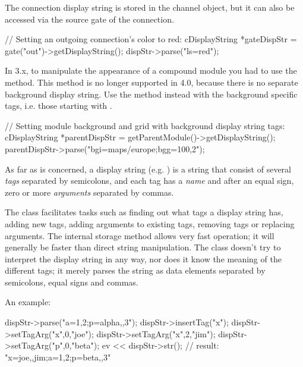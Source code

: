 \begin{note}
The connection display string is stored in the channel object, but it
can also be accessed via the source gate of the connection.
\end{note}

\begin{cpp}
// Setting an outgoing connection's color to red:
cDisplayString *gateDispStr = gate("out")->getDisplayString();
dispStr->parse("ls=red");
\end{cpp}

\begin{note}
In {\opp} 3.x, to manipulate the appearance of a compound module you had to use
the  method. This method is no longer
supported in {\opp} 4.0, because there is no separate background display string.
Use the  method instead with the background
specific tags, i.e. those starting with .
\end{note}

\begin{cpp}
// Setting module background and grid with background display string tags:
cDisplayString *parentDispStr = getParentModule()->getDisplayString();
parentDispStr->parse("bgi=maps/europe;bgg=100,2");
\end{cpp}

As far as  is concerned, a display string
(e.g. ) is a string that consist of several
\textit{tags} separated by semicolons, and each tag has a \textit{name}
and after an equal sign, zero or more \textit{arguments} separated by commas.

The class facilitates tasks such as finding out what tags a display string
has, adding new tags, adding arguments to existing tags,
removing tags or replacing arguments. The internal storage method allows
very fast operation; it will generally be faster than direct string manipulation.
The class doesn't try to interpret the display string in any way, nor does
it know the meaning of the different tags; it merely parses the string
as data elements separated by semicolons, equal signs and commas.

An example:

\begin{cpp}
dispStr->parse("a=1,2;p=alpha,,3");
dispStr->insertTag("x");
dispStr->setTagArg("x",0,"joe");
dispStr->setTagArg("x",2,"jim");
dispStr->setTagArg("p",0,"beta");
ev << dispStr->str();  // result: "x=joe,,jim;a=1,2;p=beta,,3"
\end{cpp}


